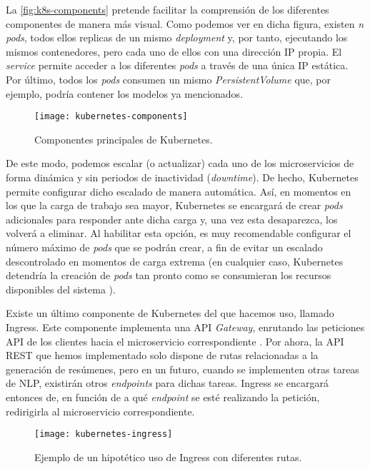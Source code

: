 La \autoref{fig:k8s-components} pretende facilitar la comprensión de los diferentes componentes de manera más visual. Como podemos ver en dicha figura, existen \emph{n} \emph{pods}, todos ellos replicas de un mismo \emph{deployment} y, por tanto, ejecutando los mismos contenedores, pero cada uno de ellos con una dirección IP propia. El \emph{service} permite acceder a los diferentes \emph{pods} a través de una única IP estática. Por último, todos los \emph{pods} consumen un mismo \emph{PersistentVolume} que, por ejemplo, podría contener los modelos ya mencionados.

\begin{figure}[!h]
	\centering
	\texttt{[image: kubernetes-components]}
	\caption{Componentes principales de Kubernetes.}
	\label{fig:k8s-components}
\end{figure}

De este modo, podemos escalar (o actualizar) cada uno de los microservicios de forma dinámica y sin periodos de inactividad (\emph{downtime}). De hecho, Kubernetes permite configurar dicho escalado de manera automática. Así, en momentos en los que la carga de trabajo sea mayor, Kubernetes se encargará de crear \emph{pods} adicionales para responder ante dicha carga y, una vez esta desaparezca, los volverá a eliminar. Al habilitar esta opción, es muy recomendable configurar el número máximo de \emph{pods} que se podrán crear, a fin de evitar un escalado descontrolado en momentos de carga extrema (en cualquier caso, Kubernetes detendría la creación de \emph{pods} tan pronto como se consumieran los recursos disponibles del sistema \cite{k8s-scheduling}).

Existe un último componente de Kubernetes del que hacemos uso, llamado Ingress. Este componente implementa una API \emph{Gateway}, enrutando las peticiones API de los clientes hacia el microservicio correspondiente \cite{api-gateway}. Por ahora, la API REST que hemos implementado solo dispone de rutas relacionadas a la generación de resúmenes, pero en un futuro, cuando se implementen otras tareas de NLP, existirán otros \emph{endpoints} para dichas tareas. Ingress se encargará entonces de, en función de a qué \emph{endpoint} se esté realizando la petición, redirigirla al microservicio correspondiente.

\begin{figure}[!h]
	\centering
	\texttt{[image: kubernetes-ingress]}
	\caption[Ejemplo de uso de Ingress con diferentes rutas.]{Ejemplo de un hipotético uso de Ingress con diferentes rutas.}
	\label{fig:k8s-ingress}
\end{figure}


